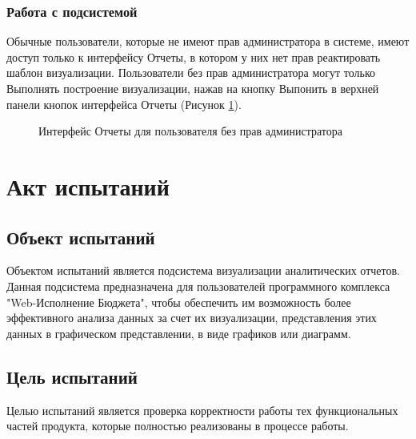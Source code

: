 \documentclass[a4paper]{extarticle}
\numberwithin{equation}{section}
\begin{document}
\subsubsection{Работа с подсистемой}
Обычные пользователи, которые не имеют прав администратора в системе, имеют доступ только к интерфейсу Отчеты, в котором у них нет прав реактировать шаблон визуализации. Пользователи без прав администратора могут только Выполнять построение визуализации, нажав на кнопку Выпонить в верхней панели кнопок интерфейса Отчеты (Рисунок \ref{ris7}).
\begin{figure}[H]
\caption{Интерфейс Отчеты для пользователя без прав администратора}
\label{ris7}
\end{figure}\par

\newpage
\section{Акт испытаний}

\subsection{Объект испытаний}
Объектом испытаний является подсистема визуализации аналитических отчетов. Данная подсистема предназначена для пользователей программного комплекса "Web-Исполнение Бюджета", чтобы обеспечить им возможность более эффективного анализа данных за счет их визуализации, представления этих данных в графическом представлении, в виде графиков или диаграмм.

\subsection{Цель испытаний}
Целью испытаний является проверка корректности работы тех функциональных частей продукта, которые полностью реализованы в процессе  работы.\par
\end{document}
